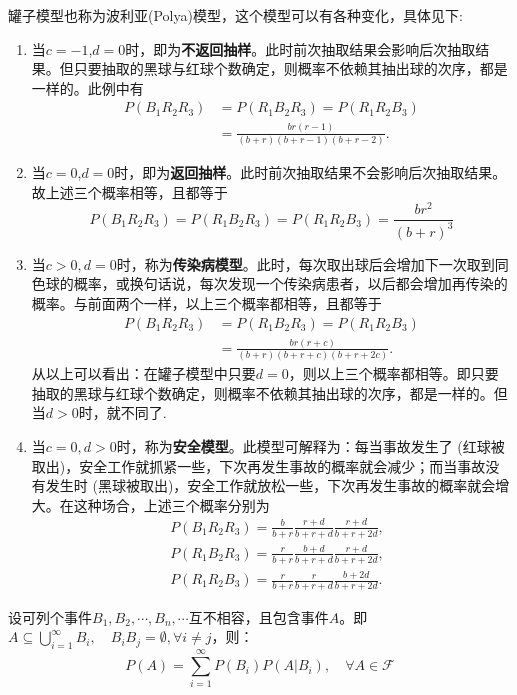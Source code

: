 罐子模型也称为波利亚(Polya)模型，这个模型可以有各种变化，具体见下:
\begin{enumerate}
    \item 当$c=-1$,$d=0$时，即为\textbf{不返回抽样}。此时前次抽取结果会影响后次抽取结果。但只要抽取的黑球与红球个数确定，则概率不依赖其抽出球的次序，都是一样的。此例中有
          \begin{align*}
              P(B_1 R_2 R_3) & = P(R_1 B_2 R_3) = P(R_1 R_2 B_3)        \\
                             & = \frac{br(r-1)}{(b+r) (b+r-1) (b+r-2)}.
          \end{align*}
    \item 当$c=0$,$d=0$时，即为\textbf{返回抽样}。此时前次抽取结果不会影响后次抽取结果。故上述三个概率相等，且都等于
          \[ P(B_1 R_2 R_3) = P(R_1 B_2 R_3) = P(R_1 R_2 B_3) = \frac{br^2}{(b+r)^3} \]
    \item 当$c>0, d=0$时，称为\textbf{传染病模型}。此时，每次取出球后会增加下一次取到同色球的概率，或换句话说，每次发现一个传染病患者，以后都会增加再传染的概率。与前面两个一样，以上三个概率都相等，且都等于
          \begin{align*}
              P(B_1 R_2 R_3) & = P(R_1 B_2 R_3) = P(R_1 R_2 B_3)       \\
                             & = \frac{br(r+c)}{(b+r)(b+r+c)(b+r+2c)}.
          \end{align*}
          从以上可以看出：在罐子模型中只要$d=0$，则以上三个概率都相等。即只要抽取的黑球与红球个数确定，则概率不依赖其抽出球的次序，都是一样的。但当$d>0$时，就不同了.
    \item 当$c=0, d>0$时，称为\textbf{安全模型}。此模型可解释为：每当事故发生了 (红球被取出)，安全工作就抓紧一些，下次再发生事故的概率就会减少；而当事故没有发生时 (黑球被取出)，安全工作就放松一些，下次再发生事故的概率就会增大。在这种场合，上述三个概率分别为
          \begin{align*}
               & P(B_1 R_2 R_3) = \frac{b}{b+r} \frac{r+d}{b+r+d} \frac{r+d}{b+r+2d}, \\
               & P(R_1 B_2 R_3) = \frac{r}{b+r} \frac{b+d}{b+r+d} \frac{r+d}{b+r+2d}, \\
               & P(R_1 R_2 B_3) = \frac{r}{b+r} \frac{r}{b+r+d} \frac{b+2d}{b+r+2d}.
          \end{align*}
\end{enumerate}

\begin{theorem}[全概率公式]
    设可列个事件$B_1, B_2, \cdots, B_n, \cdots$互不相容，且包含事件$A$。即$A \subseteq \bigcup_{i=1}^{\infty} B_i,\quad  B_i B_j= \emptyset, \forall i \neq j$，则：
    \[ P(A) = \sum_{i=1}^{\infty} P(B_i) P(A | B_i) ,\quad \forall A \in \mathscr{F}\]
\end{theorem}

